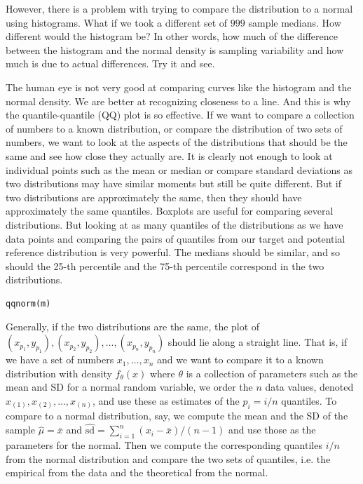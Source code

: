 However, there is a problem with trying to compare the distribution to a
normal using histograms.  What if we took a different set of $999$
sample medians.  How different would the histogram be? In other words,
how much of the difference between the histogram and the normal
density is sampling variability and how much is due to actual
differences.  Try it and see.

The human eye is not very good at comparing curves like the histogram
and the normal density.  We are better at recognizing closeness to a
line.  And this is why the quantile-quantile (QQ) plot is so effective.  If
we want to compare a collection of numbers to a known distribution, or
compare the distribution of two sets of numbers, we want to look at
the aspects of the distributions that should be the same and see how
close they actually are.  It is clearly not enough to look at
individual points such as the mean or median or compare standard
deviations as two distributions may have similar moments but still be
quite different.  But if two distributions are approximately the same,
then they should have approximately the same quantiles.  Boxplots are
useful for comparing several distributions.  But looking at as many
quantiles of the distributions as we have data points and comparing
the pairs of quantiles from our target and potential reference
distribution is very powerful.  The medians should be similar, and so
should the 25-th percentile and the 75-th percentile correspond in the
two distributions.  

\begin{verbatim}
qqnorm(m)
\end{verbatim}

Generally, if the two distributions are the same, the plot of
$(x_{p_1}, y_{p_1}), (x_{p_2}, y_{p_2}), \ldots, (x_{p_n}, y_{p_n})$
should lie along a straight line.  That is, if we have a set of
numbers $x_1, \ldots, x_n$ and we want to compare it to a known
distribution with density $f_\theta(x)$ where $\theta$ is a collection
of parameters such as the mean and SD for a normal random variable, we
order the $n$ data values, denoted $x_{(1)}, x_{(2)}, \ldots,
x_{(n)}$, and use these as estimates of the $p_i = i/n$ quantiles.  To
compare to a normal distribution, say, we compute the mean and the SD
of the sample $\hat\mu = \bar{x}$ and $\hat{\textrm{sd}} =
\sum_{i=1}^n (x_i - \bar{x})/(n-1)$ and use those as the parameters
for the normal. Then we compute the corresponding quantiles $i/n$ from
the normal distribution and compare the two sets of quantiles,
i.e. the empirical from the data and the theoretical from the normal.


